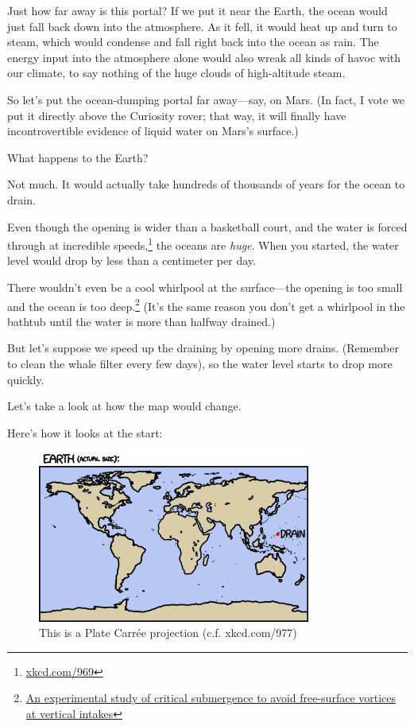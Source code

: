 {{Just how far away is this portal? If we put it near the Earth, the ocean would just fall back down into the atmosphere. As it fell, it would heat up and turn to steam, which would condense and fall right back into the ocean as rain. The energy input into the atmosphere alone would also wreak all kinds of havoc with our climate, to say nothing of the huge clouds of high-altitude steam.}

{So let's put the ocean-dumping portal far away—say, on Mars. (In fact, I vote we put it directly above the Curiosity rover; that way, it will finally have incontrovertible evidence of liquid water on Mars's surface.)}

{What happens to the Earth?}

{Not much. It would actually take hundreds of thousands of years for the ocean to drain.}

{Even though the opening is wider than a basketball court, and the water is forced through at incredible speeds,{\footnote{ \href{http://xkcd.com/969/}{xkcd.com/969}} } the oceans are \emph{huge}. When you started, the water level would drop by less than a centimeter per day.}

{There wouldn't even be a cool whirlpool at the surface—the opening is too small and the ocean is too deep.{\footnote{ \href{http://www.leg.state.mn.us/docs/pre2003/other/840235.pdf}{An experimental study of critical submergence to avoid free-surface vortices at vertical intakes}} } (It's the same reason you don't get a whirlpool in the bathtub until the water is more than halfway drained.)}

{But let's suppose we speed up the draining by opening more drains. (Remember to clean the whale filter every few days), so the water level starts to drop more quickly.}

{Let's take a look at how the map would change.}

{Here's how it looks at the start:}

\begin{figure}[!htbp]
\centering
\includegraphics[scale=0.5, max width=0.8\textwidth]{imgs/a/53/drain_0m.png}
\caption{This is a Plate Carrée projection (c.f. xkcd.com/977)}
\end{figure}

}
